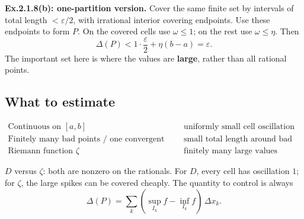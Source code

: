 \documentclass[11pt,letterpaper]{article}
\begin{document}
\textbf{Ex.2.1.8(b): one-partition version.} Cover the same finite set
by intervals of total length \(<\varepsilon/2\), with irrational
interior covering endpoints. Use these endpoints to form \(P\). On the
covered cells use \(\omega\le1\); on the rest use \(\omega\le\eta\).
Then \[
\Delta(P)<1\cdot\frac{\varepsilon}{2}+\eta(b-a)=\varepsilon.
\] The important set here is where the values are \textbf{large}, rather
than all rational points.

\subsection{What to estimate}\label{what-to-estimate}
\[
\begin{array}{l|l}
\text{Continuous on }[a,b]&\text{uniformly small cell oscillation}\\[3pt]
\text{Finitely many bad points / one convergent sequence}
&\text{small total length around bad points}\\[3pt]
\text{Riemann function }\zeta&\text{finitely many large values}
\end{array}
\]

\(D\) versus \(\zeta\): both are nonzero on the rationals. For \(D\),
every cell has oscillation \(1\); for \(\zeta\), the large spikes can be
covered cheaply. The quantity to control is always \[
\boxed{\Delta(P)=\sum_k(\sup_{I_k}f-\inf_{I_k}f)\,\Delta x_k.}
\]
\end{document}

